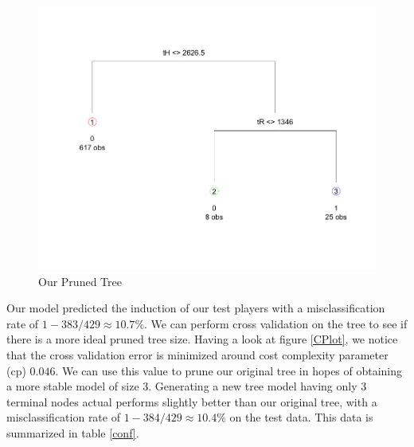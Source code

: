 \documentclass[preprint,12pt]{elsarticle}
\begin{document}
\begin{figure}[h]
       \centering 
       \includegraphics[width=0.75\linewidth]{BattersPruned}
       \caption{Our Pruned Tree}
       \label{pruned}
 \end{figure}

Our model predicted the induction of our test players with a misclassification rate of $1 - 383/429 \approx 10.7\%$. We can perform cross validation on the tree to see if there is a more ideal pruned tree size. Having a look at figure \ref{CPlot}, we notice that the cross validation error is minimized around cost complexity parameter (cp) $0.046$. We can use this value to prune our original tree in hopes of obtaining a more stable model of size 3. Generating a new tree model having only 3 terminal nodes actual performs slightly better than our original tree, with a misclassification rate of $1-384/429 \approx 10.4\%$ on the test data. This data is summarized in table \ref{conf}.







\end{document}
